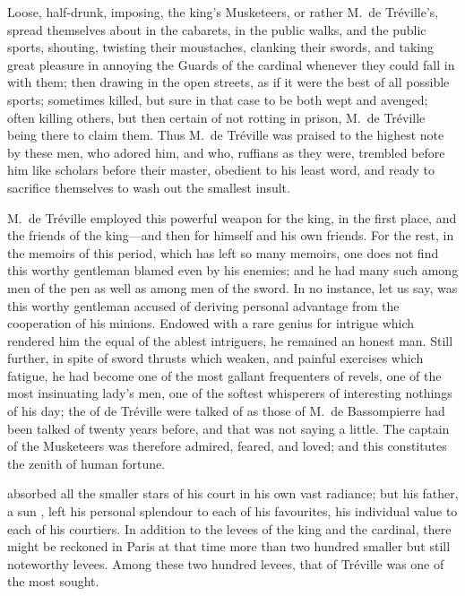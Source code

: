 Loose, half-drunk, imposing, the king's Musketeers, or rather M.~de Tréville's, spread themselves about in the cabarets, in the public walks, and the public sports, shouting, twisting their moustaches, clanking their swords, and taking great pleasure in annoying the Guards of the cardinal whenever they could fall in with them; then drawing in the open streets, as if it were the best of all possible sports; sometimes killed, but sure in that case to be both wept and avenged; often killing others, but then certain of not rotting in prison, M.~de Tréville being there to claim them. Thus M.~de Tréville was praised to the highest note by these men, who adored him, and who, ruffians as they were, trembled before him like scholars before their master, obedient to his least word, and ready to sacrifice themselves to wash out the smallest insult. 

M.~de Tréville employed this powerful weapon for the king, in the first place, and the friends of the king—and then for himself and his own friends. For the rest, in the memoirs of this period, which has left so many memoirs, one does not find this worthy gentleman blamed even by his enemies; and he had many such among men of the pen as well as among men of the sword. In no instance, let us say, was this worthy gentleman accused of deriving personal advantage from the cooperation of his minions. Endowed with a rare genius for intrigue which rendered him the equal of the ablest intriguers, he remained an honest man. Still further, in spite of sword thrusts which weaken, and painful exercises which fatigue, he had become one of the most gallant frequenters of revels, one of the most insinuating lady's men, one of the softest whisperers of interesting nothings of his day; the  of de Tréville were talked of as those of M.~de Bassompierre had been talked of twenty years before, and that was not saying a little. The captain of the Musketeers was therefore admired, feared, and loved; and this constitutes the zenith of human fortune. 

 absorbed all the smaller stars of his court in his own vast radiance; but his father, a sun , left his personal splendour to each of his favourites, his individual value to each of his courtiers. In addition to the levees of the king and the cardinal, there might be reckoned in Paris at that time more than two hundred smaller but still noteworthy levees. Among these two hundred levees, that of Tréville was one of the most sought. 

